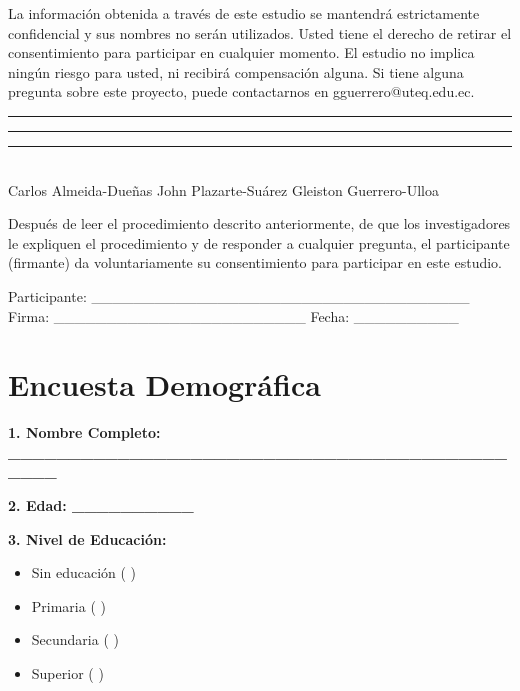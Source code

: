 \documentclass[a4paper,fleqn]{cas-sc}
\begin{document}
	La información obtenida a través de este estudio se mantendrá estrictamente confidencial y sus nombres no serán utilizados. Usted tiene el derecho de retirar el consentimiento para participar en cualquier momento. El estudio no implica ningún riesgo para usted, ni recibirá compensación alguna. Si tiene alguna pregunta sobre este proyecto, puede contactarnos en gguerrero@uteq.edu.ec.
	
	\vspace{0.5cm}
	\noindent\rule{3.65cm}{0.4pt} \hspace{1.1cm} \rule{4cm}{0.4pt} \hspace{1.1cm} \rule{4.2cm}{0.4pt}\\
	Carlos Almeida-Dueñas \hspace{2cm} John Plazarte-Suárez \hspace{2cm} Gleiston Guerrero-Ulloa
	
	Después de leer el procedimiento descrito anteriormente, de que los investigadores le expliquen el procedimiento y de responder a cualquier pregunta, el participante (firmante) da voluntariamente su consentimiento para participar en este estudio.
	
	\vspace{0.5cm}
	\noindent
	Participante: \_\_\_\_\_\_\_\_\_\_\_\_\_\_\_\_\_\_\_\_\_\_\_\_\_\_\_\_\_\_\_\_\_\_\_\_
	Firma: \_\_\_\_\_\_\_\_\_\_\_\_\_\_\_\_\_\_\_\_\_\_\_\_
	Fecha: \_\_\_\_\_\_\_\_\_\_
	
	\clearpage
	\section[\appendixname~\thesection]{Encuesta Demográfica} \label{Appendix:DemographicSurvey}
	\vspace{12pt}
	\noindent
	\textbf{1. Nombre Completo: \_\_\_\_\_\_\_\_\_\_\_\_\_\_\_\_\_\_\_\_\_\_\_\_\_\_\_\_\_\_\_\_\_\_\_\_\_\_\_\_\_\_\_\_\_}
	
	\vspace{12pt}
	\noindent
	\textbf{2. Edad: \_\_\_\_\_\_\_\_\_\_}
	
	\vspace{12pt}
	\noindent				
	\textbf{3. Nivel de Educación:}
	
	\begin{itemize}
		\item Sin educación ( )
		\item Primaria ( )
		\item Secundaria ( )
		\item Superior ( )
	\end{itemize}
	
\end{document}
